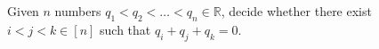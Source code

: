 \begin{problem}[3SUM]
	Given \(n\) numbers \(q_1 < q_2 < \ldots < q_n \in \mathbb{R}\), decide
	whether there exist \(i < j < k \in [n]\) such that
	\(q_i + q_j + q_k = 0\).
\end{problem}
